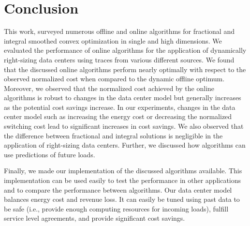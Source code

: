 
\chapter{Conclusion}\label{chapter:conclusion}

This work, surveyed numerous offline and online algorithms for fractional and integral smoothed convex optimization in single and high dimensions. We evaluated the performance of online algorithms for the application of dynamically right-sizing data centers using traces from various different sources. We found that the discussed online algorithms perform nearly optimally with respect to the observed normalized cost when compared to the dynamic offline optimum. Moreover, we observed that the normalized cost achieved by the online algorithms is robust to changes in the data center model but generally increases as the potential cost savings increase. In our experiments, changes in the data center model such as increasing the energy cost or decreasing the normalized switching cost lead to significant increases in cost savings. We also observed that the difference between fractional and integral solutions is negligible in the application of right-sizing data centers. Further, we discussed how algorithms can use predictions of future loads.

Finally, we made our implementation of the discussed algorithms available. This implementation can be used easily to test the performance in other applications and to compare the performance between algorithms. Our data center model balances energy cost and revenue loss. It can easily be tuned using past data to be safe (i.e., provide enough computing resources for incoming loads), fulfill service level agreements, and provide significant cost savings.
